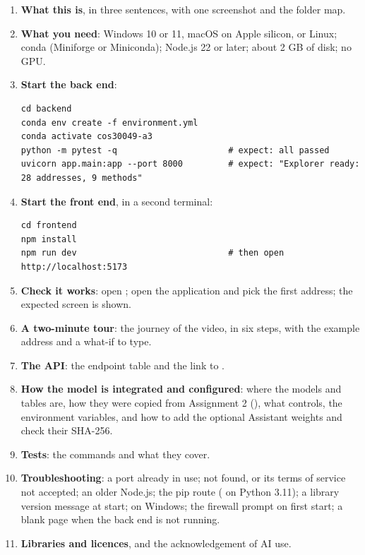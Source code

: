 \begin{enumerate}
  \item \textbf{What this is}, in three sentences, with one screenshot and the folder map.
  \item \textbf{What you need}: Windows 10 or 11, macOS on Apple silicon, or Linux; conda
    (Miniforge or Miniconda); Node.js 22 or later; about 2 GB of disk; no GPU.
  \item \textbf{Start the back end}:
\begin{lstlisting}
cd backend
conda env create -f environment.yml
conda activate cos30049-a3
python -m pytest -q                      # expect: all passed
uvicorn app.main:app --port 8000         # expect: "Explorer ready: 28 addresses, 9 methods"
\end{lstlisting}
  \item \textbf{Start the front end}, in a second terminal:
\begin{lstlisting}
cd frontend
npm install
npm run dev                              # then open http://localhost:5173
\end{lstlisting}
  \item \textbf{Check it works}: open ; open the
    application and pick the first address; the expected screen is shown.
  \item \textbf{A two-minute tour}: the journey of the video, in six steps, with the example
    address and a what-if to type.
  \item \textbf{The API}: the endpoint table and the link to .
  \item \textbf{How the model is integrated and configured}: where the models and tables are, how
    they were copied from Assignment 2 (), what  controls, the
    environment variables, and how to add the optional Assistant weights and check their SHA-256.
  \item \textbf{Tests}: the commands and what they cover.
  \item \textbf{Troubleshooting}: a port already in use;  not found, or its terms of
    service not accepted; an older Node.js; the pip route (
    on Python 3.11); a library version message at start;  on Windows; the
    firewall prompt on first start; a blank page when the back end is not running.
  \item \textbf{Libraries and licences}, and the acknowledgement of AI use.
\end{enumerate}

